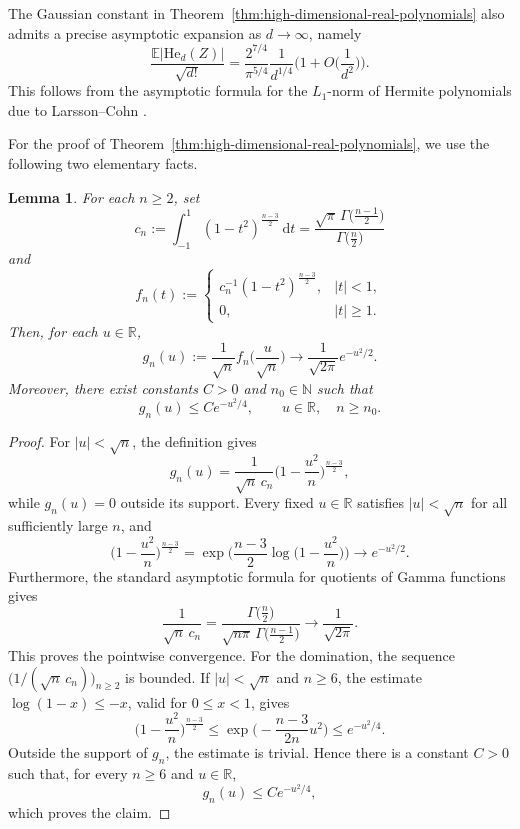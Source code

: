 \documentclass[11pt,showkeys]{amsart}
\newtheorem{lemma}[theorem]{Lemma}
\begin{document}
The Gaussian constant in
Theorem~\ref{thm:high-dimensional-real-polynomials} also admits a precise
asymptotic expansion as $d\to\infty$, namely
\[
\frac{\mathbb E|\mathrm{He}_d(Z)|}{\sqrt{d!}}
=
\frac{2^{7/4}}{\pi^{5/4}}\frac{1}{d^{1/4}}
\bigg(
1+O\bigg(\frac{1}{d^2}\bigg)
\bigg).
\]
This follows from the asymptotic formula for the $L_1$-norm of Hermite
polynomials due to Larsson--Cohn
\cite[Remarks~2.6 and~3.2]{larsson2002p}.

For the proof of Theorem~\ref{thm:high-dimensional-real-polynomials}, we use
the following two elementary facts.

\begin{lemma}
\label{lem:ultraspherical-gaussian-limit}
For each $n\geq2$, set
\[
c_n
:=
\int_{-1}^{1}(1-t^2)^{\frac{n-3}{2}}\,\mathrm{d} t
=
\frac{
\sqrt{\pi}\,\Gamma\bigl(\frac{n-1}{2}\bigr)}
{\Gamma\bigl(\frac n2\bigr)}
\]
and
\[
f_n(t)
:=
\begin{cases}
c_n^{-1}(1-t^2)^{\frac{n-3}{2}}, & |t|<1,\\
0, & |t|\geq1.
\end{cases}
\]
Then, for each $u\in\mathbb R$,
\[
g_n(u)
:=
\frac{1}{\sqrt n}
f_n\bigg(\frac{u}{\sqrt n}\bigg)
\longrightarrow
\frac{1}{\sqrt{2\pi}}e^{-u^2/2}.
\]
Moreover, there exist constants $C>0$ and $n_0\in\mathbb N$ such that
\[
g_n(u)
\leq
Ce^{-u^2/4},
\qquad
u\in\mathbb R,\quad n\geq n_0.
\]
\end{lemma}

\begin{proof}
For \(|u|<\sqrt n\), the definition gives
\[
g_n(u)
=
\frac{1}{\sqrt n\,c_n}
\bigg(1-\frac{u^2}{n}\bigg)^{\frac{n-3}{2}},
\]
while \(g_n(u)=0\) outside its support. Every fixed \(u\in\mathbb R\)
satisfies \(|u|<\sqrt n\) for all sufficiently large \(n\), and
\[
\bigg(1-\frac{u^2}{n}\bigg)^{\frac{n-3}{2}}
=
\exp\bigg(
\frac{n-3}{2}
\log\bigg(1-\frac{u^2}{n}\bigg)
\bigg)
\longrightarrow
e^{-u^2/2}.
\]
Furthermore, the standard asymptotic formula for quotients of Gamma
functions gives
\[
\frac{1}{\sqrt n\,c_n}
=
\frac{\Gamma\bigl(\frac n2\bigr)}
{\sqrt{n\pi}\,\Gamma\bigl(\frac{n-1}{2}\bigr)}
\longrightarrow
\frac{1}{\sqrt{2\pi}}.
\]
This proves the pointwise convergence.
For the domination, the sequence
\(\bigl(1/(\sqrt n\,c_n)\bigr)_{n\geq2}\) is bounded. If
\(|u|<\sqrt n\) and \(n\geq6\), the estimate
\(\log(1-x)\leq-x\), valid for \(0\leq x<1\), gives
\[
\bigg(1-\frac{u^2}{n}\bigg)^{\frac{n-3}{2}}
\leq
\exp\bigg(-\frac{n-3}{2n}u^2\bigg)
\leq
e^{-u^2/4}.
\]
Outside the support of \(g_n\), the estimate is trivial. Hence there is
a constant \(C>0\) such that, for every \(n\geq6\) and \(u\in\mathbb R\),
\[
        g_n(u)\leq Ce^{-u^2/4},
\]
which proves the claim.
\end{proof}
\end{document}
